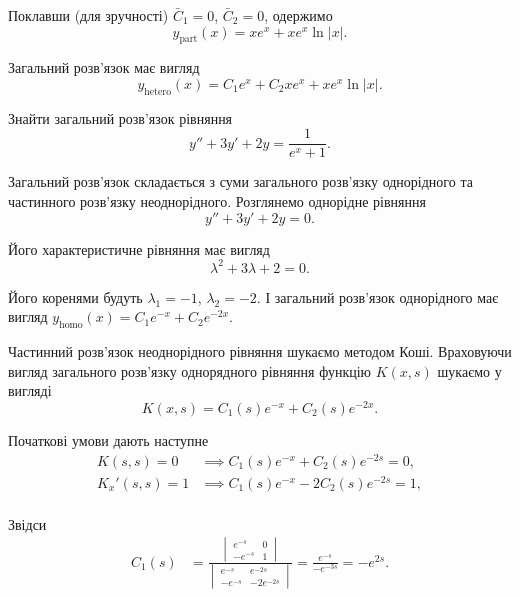 \begin{solution}
	Поклавши (для зручності) $\bar C_1 = 0$, $\bar C_2 = 0$, одержимо
	\begin{equation*}
		y_{\text{part}}(x) = x e^x + x e^x \ln |x|.
	\end{equation*}
	
	Загальний розв'язок має вигляд
	\begin{equation*}
		y_{\text{hetero}}(x) = C_1 e^x + C_2 x e^x + x e^x \ln |x|.
	\end{equation*}
\end{solution}

\begin{example}
	Знайти загальний розв'язок рівняння \[y'' + 3 y' + 2 y = \frac{1}{e^x + 1}.\]
\end{example}

\begin{solution}
	Загальний розв'язок складається з суми загального роз\-в'яз\-ку однорідного та частинного роз\-в'яз\-ку неоднорідного. Розглянемо однорідне рівняння
	\begin{equation*}
		y'' + 3 y ' + 2 y = 0.
	\end{equation*}
	
	Його характеристичне рівняння має вигляд
	\begin{equation*}
		\lambda^2 + 3 \lambda + 2 = 0.
	\end{equation*}
	
	Його коренями будуть $\lambda_1 = - 1$, $\lambda_2 = -2$. І загальний розв'язок однорідного має вигляд $y_{\text{homo}}(x) = C_1 e^{-x} + C_2 e^{-2x}$. \parvskip

	Частинний розв'язок неоднорідного рівняння шукаємо методом Коші. Враховуючи вигляд загального роз\-в'яз\-ку однорядного рівняння функцію $K(x, s)$ шукаємо у вигляді
	\begin{equation*}
		K(x, s) = C_1(s) e^{-x} + C_2(s) e^{-2x}.
	\end{equation*}

	Початкові умови дають наступне
	\begin{align*}
		K(s, s) = 0 &\implies C_1(s) e^{-x} + C_2(s) e^{-2s} = 0, \\
		K_x'(s, s) = 1 &\implies C_1(s) e^{-x} - 2 C_2(s) e^{-2s} = 1, \\
	\end{align*}

	Звідси
	\begin{align*}
		C_1(s) &= \frac{\begin{vmatrix} e^{-s} & 0 \\ -e^{-s} & 1 \end{vmatrix}}{\begin{vmatrix} e^{-s} & e^{-2s} \\ -e^{-s} & -2e^{-2s} \end{vmatrix}} = \frac{e^{-s}}{-e^{-3s}} = -e^{2s}.
	\end{align*}


\end{solution}
